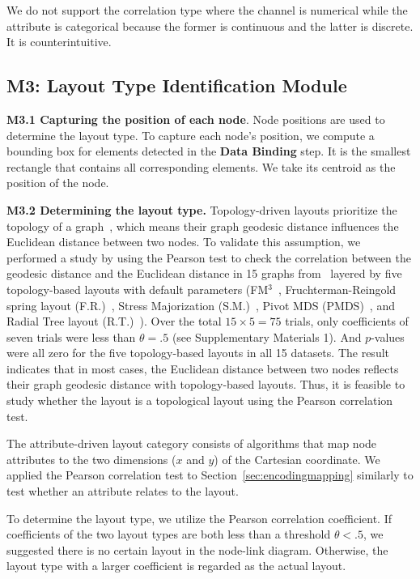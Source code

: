 We do not support the correlation type where the channel is numerical while the attribute is categorical because the former is continuous and the latter is discrete. It is counterintuitive.

\subsection{\textbf{M3}: Layout Type Identification Module}


\textbf{M3.1 Capturing the position of each node}.
Node positions are used to determine the layout type.
To capture each node's position, we compute a bounding box for elements detected in the \textbf{Data Binding} step.
It is the smallest rectangle that contains all corresponding elements.
We take its centroid as the position of the node.

\textbf{M3.2 Determining the layout type.} 
Topology-driven layouts prioritize the topology of a graph~\cite{DBLP:journals/cgf/NobreMSL19}, which means their graph geodesic distance influences the Euclidean distance between two nodes. To validate this assumption, we performed a study by using the Pearson test to check the correlation between the geodesic distance and the Euclidean distance in 15 graphs from~\cite{DBLP:journals/tvcg/ZhuCHHLZ21} layered by five topology-based layouts with default parameters (FM$^3$~\cite{hachul2004drawing}, Fruchterman-Reingold spring layout (F.R.)~\cite{DBLP:journals/spe/FruchtermanR91}, Stress Majorization (S.M.)~\cite{DBLP:conf/gd/GansnerKN04}, Pivot MDS (PMDS)~\cite{DBLP:conf/gd/BrandesP06}, and Radial Tree layout (R.T.)~\cite{DBLP:conf/infovis/Jankun-KellyM03}).
Over the total $15 \times 5 = 75$ trials, only coefficients of seven trials were less than $\theta = .5$ (see Supplementary Materials 1). And $p$-values were all zero for the five topology-based layouts in all 15 datasets.
The result indicates that in most cases, the Euclidean distance between two nodes reflects their graph geodesic distance with topology-based layouts.
Thus, it is feasible to study whether the layout is a topological layout using the Pearson correlation test.

The attribute-driven layout category consists of algorithms that map node attributes to the two dimensions ($x$ and $y$) of the Cartesian coordinate. 
We applied the Pearson correlation test to Section~\ref{sec:encodingmapping} similarly to test whether an attribute relates to the layout.

To determine the layout type, we utilize the Pearson correlation coefficient. If coefficients of the two layout types are both less than a threshold $\theta < .5$, we suggested there is no certain layout in the node-link diagram. Otherwise, the layout type with a larger coefficient is regarded as the actual layout. 